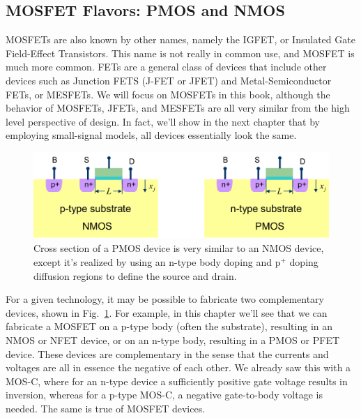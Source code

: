 \subsection{MOSFET Flavors:  PMOS and NMOS}
MOSFETs are also known by other names, namely the IGFET, or Insulated Gate Field-Effect Transistors.  This name is not really in common use, and MOSFET is much more common.  FETs are a general class of devices that include other devices such as Junction FETS (J-FET or JFET) and Metal-Semiconductor FETs, or MESFETs.  We will focus on MOSFETs in this book, although the behavior of MOSFETs, JFETs, and MESFETs are all very similar from the high level perspective of design.  In fact, we'll show in the next chapter that by employing small-signal models, all devices essentially look the same.
\begin{figure}[tb]
\centering
\includegraphics[width=.75\columnwidth]{pmos_xsect}
\caption{Cross section of a PMOS device is very similar to an NMOS device, except it's realized by using an n-type body doping and p$^+$ doping diffusion regions to define the source and drain.} \label{fig:pmos_xsect}
\end{figure}
For a given technology, it may be possible to fabricate two complementary devices, shown in Fig.~\ref{fig:pmos_xsect}.  For example, in this chapter we'll see that we can fabricate a MOSFET on a p-type body (often the substrate), resulting in an NMOS or NFET device, or on an n-type body, resulting in a PMOS or PFET device.  These devices are complementary in the sense that the currents and voltages are all in essence the negative of each other.  We already saw this with a MOS-C, where for an n-type device a sufficiently positive gate voltage results in inversion, whereas for a p-type MOS-C, a negative gate-to-body voltage is needed. The same is true of MOSFET devices.
